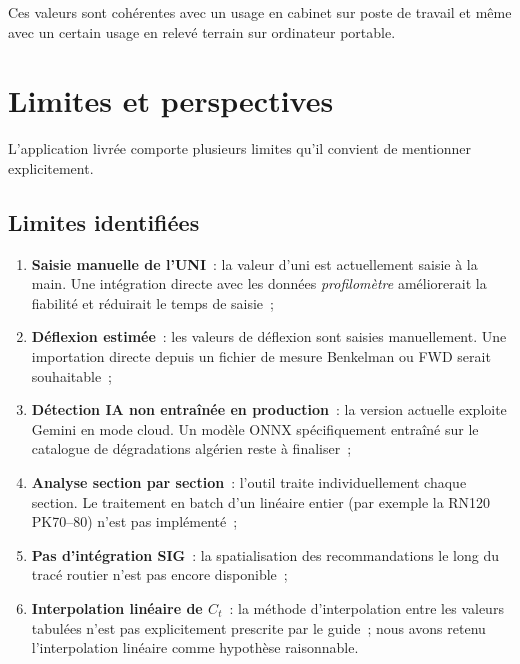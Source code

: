 Ces valeurs sont cohérentes avec un usage en cabinet sur poste de
travail et même avec un certain usage en relevé terrain sur
ordinateur portable.


\section{Limites et perspectives}
\label{sec:limites}

L'application livrée comporte plusieurs limites qu'il convient de
mentionner explicitement.

\subsection{Limites identifiées}
\label{sec:limites-identifiees}

\begin{enumerate}
  \item \textbf{Saisie manuelle de l'UNI}~: la valeur d'uni est
        actuellement saisie à la main. Une intégration directe avec
        les données \emph{profilomètre} améliorerait la fiabilité et
        réduirait le temps de saisie~;
  \item \textbf{Déflexion estimée}~: les valeurs de déflexion sont
        saisies manuellement. Une importation directe depuis un
        fichier de mesure Benkelman ou FWD serait souhaitable~;
  \item \textbf{Détection IA non entraînée en production}~: la version
        actuelle exploite Gemini en mode cloud. Un modèle ONNX
        spécifiquement entraîné sur le catalogue de dégradations
        algérien reste à finaliser~;
  \item \textbf{Analyse section par section}~: l'outil traite
        individuellement chaque section. Le traitement en batch d'un
        linéaire entier (par exemple la RN120 PK70--80) n'est pas
        implémenté~;
  \item \textbf{Pas d'intégration SIG}~: la spatialisation des
        recommandations le long du tracé routier n'est pas encore
        disponible~;
  \item \textbf{Interpolation linéaire de $C_t$}~: la méthode
        d'interpolation entre les valeurs tabulées n'est pas
        explicitement prescrite par le guide~; nous avons retenu
        l'interpolation linéaire comme hypothèse raisonnable.
\end{enumerate}


